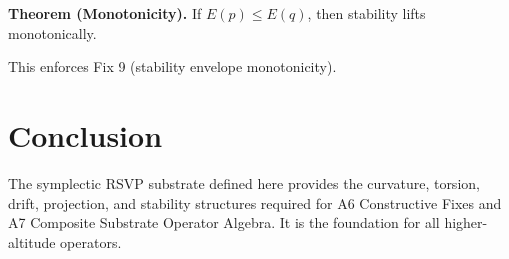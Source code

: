 \documentclass[11pt]{article}
\begin{document}
\textbf{Theorem (Monotonicity).}
If $E(p) \le E(q)$, then stability lifts monotonically.

This enforces Fix 9 (stability envelope monotonicity).

\section{Conclusion}

The symplectic RSVP substrate defined here provides the curvature, torsion,
drift, projection, and stability structures required for A6 Constructive Fixes
and A7 Composite Substrate Operator Algebra. It is the foundation for all
higher-altitude operators.
\end{document}
